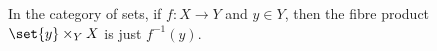 In the category of sets, if $f\colon X\to Y$ and $y \in Y$, then the fibre product
$\set{y}\times_Y X$ is just $f^{-1}(y)$.
